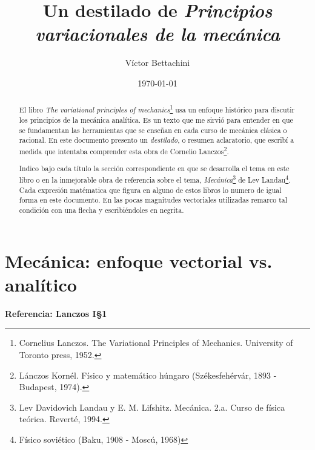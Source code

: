 \documentclass[12pt, spanish, a4paper, ]{article}
\title{Un destilado de \emph{Principios variacionales de la mecánica}}
\author{Víctor Bettachini}
\date{\today}
\begin{document}
\maketitle
%

\begin{abstract}
	El libro \emph{The variational principles of mechanics}\footnote{Cornelius Lanczos. The Variational Principles of Mechanics. University of Toronto press, 1952.
} usa un enfoque histórico para discutir los principios de la mecánica analítica.
	Es un texto que me sirvió para entender en que se fundamentan las herramientas que se enseñan en cada curso de mecánica clásica o racional.
	En este documento presento un \emph{destilado}, o resumen aclaratorio, que escribí a medida que intentaba comprender esta obra de Cornelio Lanczos\footnote{Lánczos Kornél. Físico y matemático húngaro (Székesfehérvár, 1893 - Budapest, 1974).}.

	Indico bajo cada título la sección correspondiente en que se desarrolla el tema en este libro o en la inmejorable obra de referencia sobre el tema, \emph{Mecánica}\footnote{Lev Davidovich Landau y E. M. Lifshitz. Mecánica. 2.a. Curso de física teórica. Reverté, 1994.
} de Lev Landau\footnote{Físico soviético (Baku, 1908 - Moscú, 1968)}. 
	Cada expresión matématica que figura en alguno de estos libros lo numero de igual forma en este documento.
	En las pocas magnitudes vectoriales utilizadas remarco tal condición con una flecha y escribiéndoles en negrita.
\end{abstract}


\tableofcontents


\section{Mecánica: enfoque vectorial vs. analítico}
\textbf{Referencia: Lanczos I\S1}\\
\end{document}
